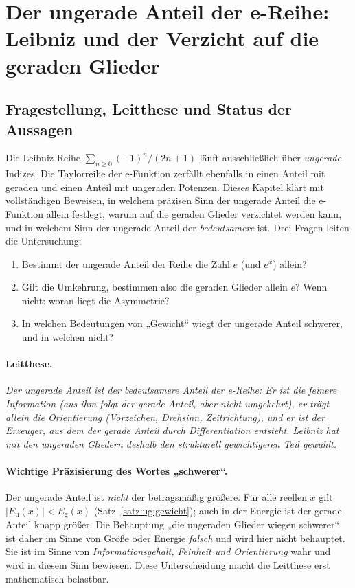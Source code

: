 \section{Der ungerade Anteil der e-Reihe: Leibniz und der Verzicht auf die geraden Glieder}
\label{sec:ug}

\subsection{Fragestellung, Leitthese und Status der Aussagen}
\label{sec:ug:frage}

Die Leibniz-Reihe $\sum_{n\ge 0}(-1)^n/(2n+1)$ läuft ausschließlich über \emph{ungerade} Indizes. Die Taylorreihe der e-Funktion zerfällt ebenfalls in einen Anteil mit geraden und einen Anteil mit ungeraden Potenzen. Dieses Kapitel klärt mit vollständigen Beweisen, in welchem präzisen Sinn der ungerade Anteil die e-Funktion allein festlegt, warum auf die geraden Glieder verzichtet werden kann, und in welchem Sinn der ungerade Anteil der \emph{bedeutsamere} ist. Drei Fragen leiten die Untersuchung:

\begin{enumerate}[label=\textbf{F\arabic*.}]
\item Bestimmt der ungerade Anteil der Reihe die Zahl $e$ (und $e^x$) allein?
\item Gilt die Umkehrung, bestimmen also die geraden Glieder allein $e$? Wenn nicht: woran liegt die Asymmetrie?
\item In welchen Bedeutungen von „Gewicht“ wiegt der ungerade Anteil schwerer, und in welchen nicht?
\end{enumerate}

\paragraph{Leitthese.}
\emph{Der ungerade Anteil ist der bedeutsamere Anteil der e-Reihe: Er ist die feinere Information (aus ihm folgt der gerade Anteil, aber nicht umgekehrt), er trägt allein die Orientierung (Vorzeichen, Drehsinn, Zeitrichtung), und er ist der Erzeuger, aus dem der gerade Anteil durch Differentiation entsteht. Leibniz hat mit den ungeraden Gliedern deshalb den strukturell gewichtigeren Teil gewählt.}

\paragraph{Wichtige Präzisierung des Wortes „schwerer“.}
Der ungerade Anteil ist \emph{nicht} der betragsmäßig größere. Für alle reellen $x$ gilt $|E_{\mathrm u}(x)|<E_{\mathrm g}(x)$ (Satz~\ref{satz:ug:gewicht}); auch in der Energie ist der gerade Anteil knapp größer. Die Behauptung „die ungeraden Glieder wiegen schwerer“ ist daher im Sinne von Größe oder Energie \emph{falsch} und wird hier nicht behauptet. Sie ist im Sinne von \emph{Informationsgehalt, Feinheit und Orientierung} wahr und wird in diesem Sinn bewiesen. Diese Unterscheidung macht die Leitthese erst mathematisch belastbar.

